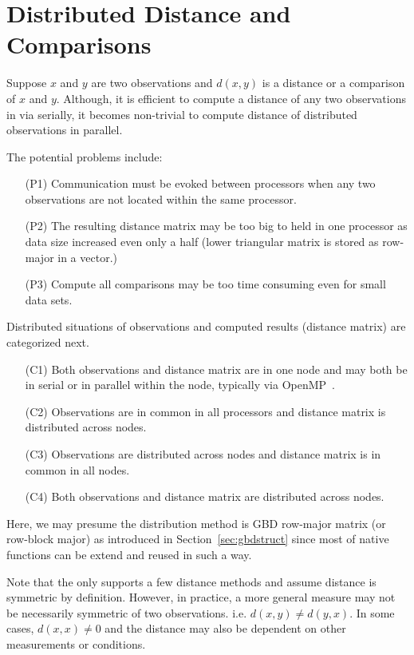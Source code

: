 \section{Distributed Distance and Comparisons}

Suppose $x$ and $y$ are two observations and $d(x, y)$ is a distance or
a comparison of $x$ and $y$.
Although, it is efficient to compute a distance of any two observations
in  via 
serially, it becomes non-trivial to
compute distance of distributed observations in parallel.

The potential problems include:
\begin{itemize}
\item[(P1)]
      Communication must be evoked between processors when any two observations
      are not located within the same processor.
\item[(P2)]
      The resulting distance matrix may be too big
      to held in one processor as data size increased even only a half (lower
      triangular matrix is stored as row-major in a vector.)
\item[(P3)]
      Compute all comparisons may be too time consuming even for small data
      sets. 
\end{itemize}

Distributed situations of observations and computed results (distance
matrix) are categorized next.
\begin{itemize}
\item[(C1)]
      Both observations and distance matrix are in one node and may both be
      in serial or in parallel within the node, typically via
      OpenMP~\citep{OpenMP}.
\item[(C2)]
      Observations are in common in all processors
      and distance matrix is distributed across nodes.
\item[(C3)]
      Observations are distributed across nodes
      and distance matrix is in common in all nodes.
\item[(C4)]
      Both observations and distance matrix are distributed
      across nodes.
\end{itemize}
Here, we may presume the distribution method is GBD row-major matrix (or
row-block major) as introduced in Section~\ref{sec:gbdstruct} since most of
native  functions can be extend and reused in such a way.

Note that the  only supports a few distance methods and assume
distance is symmetric by definition. However,
in practice, a more general measure may not be necessarily
symmetric of two observations. i.e. $d(x, y) \neq d(y, x)$.
In some cases, $d(x, x) \neq 0$ and the distance may also be dependent
on other measurements or conditions.


